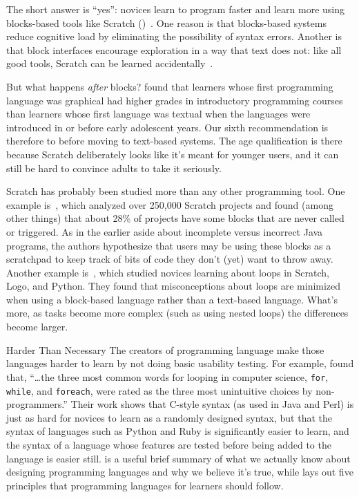 
The short answer is ``yes'':
novices learn to program faster and learn more
using blocks-based tools like Scratch ()~\cite{Wein2017}.
One reason is that blocks-based systems reduce cognitive load by eliminating the possibility of syntax errors.
Another is that block interfaces encourage exploration in a way that text does not:
like all good tools,
Scratch can be learned accidentally~\cite{Malo2010}.

But what happens \emph{after} blocks?
\cite{Chen2018} found that learners whose first programming language was graphical
had higher grades in introductory programming courses
than learners whose first language was textual
when the languages were introduced in or before early adolescent years.
Our sixth recommendation is therefore to
before moving to text-based systems.
The age qualification is there because Scratch deliberately looks like it's meant for younger users,
and it can still be hard to convince adults to take it seriously.


Scratch has probably been studied more than any other programming tool.
One example is~\cite{Aiva2016},
which analyzed over 250,000 Scratch projects
and found (among other things) that about 28\% of projects have some blocks that are never called or triggered.
As in the earlier aside about incomplete versus incorrect Java programs,
the authors hypothesize that users may be using these blocks as a scratchpad
to keep track of bits of code they don't (yet) want to throw away.
Another example is~\cite{Grov2017,Mlad2017},
which studied novices learning about loops in Scratch, Logo, and Python.
They found that misconceptions about loops are minimized when using a block-based language
rather than a text-based language.
What's more,
as tasks become more complex (such as using nested loops)
the differences become larger.

\begin{aside}{Harder Than Necessary}
  The creators of programming language make those languages harder to learn by not doing basic usability testing.
  For example,
  \cite{Stef2013} found that,
  ``{\ldots}the three most common words for looping in computer science,
  \texttt{for}, \texttt{while}, and \texttt{foreach},
  were rated as the three most unintuitive choices by non-programmers.''
  Their work shows that C-style syntax (as used in Java and Perl)
  is just as hard for novices to learn as a randomly designed syntax,
  but that the syntax of languages such as Python and Ruby
  is significantly easier to learn,
  and the syntax of a language whose features are tested before being added to the language is easier still.
  \cite{Stef2017} is a useful brief summary of what we actually know about designing programming languages
  and why we believe it's true,
  while \cite{Guzd2016} lays out five principles that programming languages for learners should follow.
\end{aside}


